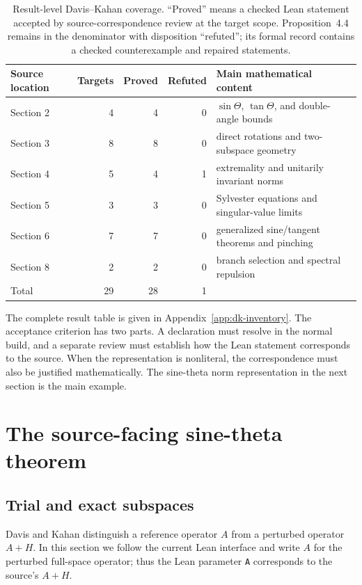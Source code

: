 \documentclass[11pt]{article}
\begin{document}
\begin{table}[H]
\centering
\small
\begin{tabular}{lrrrl}
\toprule
Source location & Targets & Proved & Refuted & Main mathematical content \\
\midrule
Section 2 & 4 & 4 & 0 & $\sin\Theta$, $\tan\Theta$, and double-angle bounds \\
Section 3 & 8 & 8 & 0 & direct rotations and two-subspace geometry \\
Section 4 & 5 & 4 & 1 & extremality and unitarily invariant norms \\
Section 5 & 3 & 3 & 0 & Sylvester equations and singular-value limits \\
Section 6 & 7 & 7 & 0 & generalized sine/tangent theorems and pinching \\
Section 8 & 2 & 2 & 0 & branch selection and spectral repulsion \\
\midrule
Total & 29 & 28 & 1 & \\
\bottomrule
\end{tabular}
\caption{Result-level Davis--Kahan coverage.  ``Proved'' means a checked Lean
statement accepted by source-correspondence review at the target scope.
Proposition~4.4 remains in the denominator with disposition ``refuted''; its
formal record contains a checked counterexample and repaired statements.}
\label{tab:dk-coverage}
\end{table}

The complete result table is given in Appendix~\ref{app:dk-inventory}.  The
acceptance criterion has two parts.  A declaration must resolve in the normal
build, and a separate review must establish how the Lean statement corresponds
to the source.  When the representation is nonliteral, the correspondence must
also be justified mathematically.  The sine-theta norm representation in the
next section is the main example.

\section{The source-facing sine-theta theorem}
\label{sec:sine-theta}

\subsection{Trial and exact subspaces}

Davis and Kahan distinguish a reference operator $A$ from a perturbed operator
$A+H$.  In this section we follow the current Lean interface and write $A$ for
the perturbed full-space operator; thus the Lean parameter \texttt{A}
corresponds to the source's $A+H$.
\end{document}
